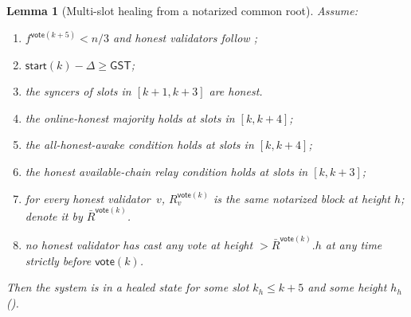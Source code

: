 \documentclass{article}
\newcommand{\start}{\mathsf{start}}
\newcommand{\vote}{\mathsf{vote}}
\newcommand{\comm}[1]{\bar{#1}}
\newcommand{\getConfirmed}{\textsf{getConfirmed}\xspace}
\theoremstyle{plain}
\newtheorem{lemma}{Lemma}
\theoremstyle{definition}
\theoremstyle{remark}
\newcommand{\GST}{\ensuremath{\mathsf{GST}}}
\newcommand{\OHM}{online-honest majority\xspace}
\newcommand{\HAR}{honest available-chain relay\xspace}
\newcommand{\AHA}{all-honest-awake\xspace}
\begin{document}
\begin{lemma}[Multi-slot healing from a notarized common root]\label{rev:lem:healing-from-notarized-multi}
Assume:
\begin{enumerate}
  \item\label{rev:hfnm:f} $f^{\vote(k+5)} < n/3$ and honest validators follow ;
  \item\label{rev:hfnm:sync} $\start(k) - \Delta \geq \GST$;
  \item\label{rev:hfnm:syncers} the syncers of slots in $[k+1, k+3]$ are honest.
  \item\label{rev:hfnm:ohm} the \OHM holds at slots in $[k, k+4]$;
  \item\label{rev:hfnm:aha} the \AHA condition holds at slots in $[k, k+4]$;
  \item\label{rev:hfnm:har} the \HAR condition holds at slots in $[k, k+3]$;
  \item\label{rev:hfnm:r} for every honest validator~$v$, $R_v^{\vote(k)}$ is the same notarized block at height $h$; denote it by $\comm{R}^{\vote(k)}$.
  \item\label{rev:hfnm:nh} no honest validator has cast any vote at height $> \comm{R}^{\vote(k)}.h$ at any time strictly before $\vote(k)$.
\end{enumerate}
Then the system is in a healed state for some slot $k_h \leq k+5$ and some height $h_h$ ().
\end{lemma}
\end{document}
